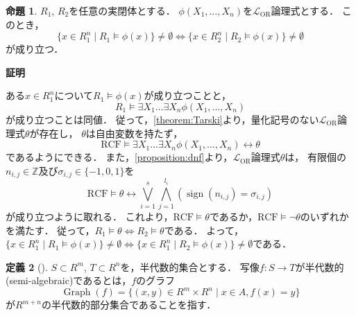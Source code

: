 \documentclass[uplatex, dvipdfmx]{jsarticle}
\makeatletter
\numberwithin{equation}{section}
\renewenvironment{proof}[1][\proofname]{\par
  \pushQED{\qed}%
  \normalfont \topsep6\p@\@plus6\p@\relax
  \trivlist
  \item\relax
  {\bfseries
  #1\@addpunct{.}}\hspace\labelsep\ignorespaces
}{
  \popQED\endtrivlist\@endpefalse
}
\newcommand{\Z}{\mathbb{Z}}
\newcommand{\RCF}{\mathrm{RCF}}
\newcommand{\map}[3]{{#1}\colon{#2}\rightarrow{#3}}
\DeclareMathOperator{\sign}{sign}
\DeclareMathOperator{\Graph}{Graph}
\theoremstyle{definition}
\newtheorem{definition}{定義}[section]
\newtheorem{proposition}[definition]{命題}
\renewcommand{\proofname}{\textbf{証明}}
\makeatother
\begin{document}
\begin{proposition}\label{proposition:Artin-Lang}
     $R_1$, $R_2$を任意の実閉体とする．
     $\phi(X_1, \dots, X_n)$を$\mathcal{L}_\mathrm{OR}$論理式とする．
     このとき，
     \begin{equation}
          \{x \in R_1^n \mid R_1 \models \phi(x)\} \neq \emptyset \iff
          \{x \in R_2^n \mid R_2 \models \phi(x)\} \neq \emptyset
     \end{equation}
     が成り立つ．
\end{proposition}
\begin{proof}
     ある$x \in R_1^n$について$R_1 \models \phi(x)$が成り立つことと，
     \begin{equation}
          R_1 \models \exists X_1 \dots \exists X_n \phi(X_1, \dots, X_n)
     \end{equation}
     が成り立つことは同値．
     従って，\cref{theorem:Tarski}より，量化記号のない$\mathcal{L}_\mathrm{OR}$論理式$\theta$が存在し，
     $\theta$は自由変数を持たず，
     \begin{equation}
          \RCF \models \exists X_1 \dots \exists X_n \phi(X_1, \dots, X_n) \leftrightarrow \theta
     \end{equation}
     であるようにできる．
     また，\cref{proposition:dnf}より，$\mathcal{L}_\mathrm{OR}$論理式$\theta$は，
     有限個の$n_{i,j} \in \Z$及び$\sigma_{i,j} \in \{-1, 0, 1\}$を
     \begin{equation}
          \RCF \models \theta \leftrightarrow \bigvee_{i=1}^s \bigwedge_{j=1}^{l_i} (\sign(n_{i,j}) = \sigma_{i,j})
     \end{equation}
     が成り立つように取れる．
     これより，$\RCF \models \theta$であるか，$\RCF \models \lnot \theta$のいずれかを満たす．
     従って，$R_1 \models \theta \iff R_2 \models \theta$である． 
     よって，$\{x \in R_1^n \mid R_1 \models \phi(x)\} \neq \emptyset \iff \{x \in R_1^n \mid R_2 \models \phi(x)\} \neq \emptyset$である．
\end{proof}

\begin{definition}[{\cite[Definition 2.2.5]{MR1659509}}]
     $S \subset R^m$, $T \subset R^n$を，半代数的集合とする．
     写像$\map{f}{S}{T}$が半代数的(semi-algebraic)であるとは，$f$のグラフ
     \begin{equation}
          \Graph(f) = \{(x, y) \in R^m \times R^n \mid x \in A, f(x) = y\}
     \end{equation}
     が$R^{m+n}$の半代数的部分集合であることを指す．
\end{definition}
\end{document}

